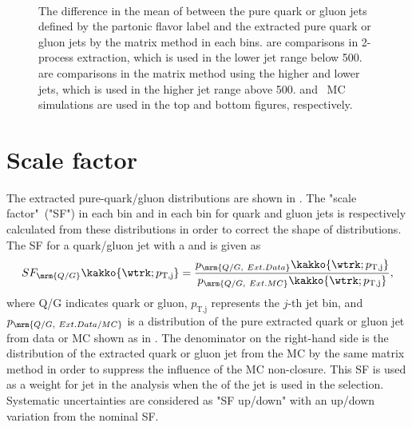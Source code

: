 \begin{figure}[htb]
  \centering
   \quad
  \\ \quad
  \caption[]{
    The difference in the mean of \cbeta between the pure quark or gluon jets defined by the partonic flavor label %
    and the extracted pure quark or gluon jets by the matrix method in each \pt bins. %
     are comparisons in 2-process extraction, 
    which is used in the lower jet \pt range below 500\GeV.
     are comparisons in the matrix method %
    using the higher and lower \abseta jets, 
    which is used in the higher jet \pt range above 500\GeV.
     and \sherpa~MC simulations are used in the top and bottom figures, respectively.
    \label{fig:QG-C1B02Closure}
    }
\end{figure}


\FloatBarrier

\section{Scale factor}
\label{sec:QG-SF}

The extracted pure-quark/gluon distributions are shown in . %
The "scale factor"~("SF") in each \wtrk bin and in each \pt bin for quark and gluon jets is respectively calculated from these distributions %
in order to correct the shape of \wtrk distributions. %
The SF for a quark/gluon jet with a \pt and \wtrk is given as %
\begin{equation}
  SF_{\mrm{Q/G}}\kakko{\wtrk;p_{\text{T,j}}} = \frac{ p_{\mrm{Q/G,~Ext.Data}}\kakko{\wtrk;p_{\text{T,j}}} }{ p_{\mrm{Q/G,~Ext.MC}}\kakko{\wtrk;p_{\text{T,j}}}  }, 
  \label{eq:QG-SF}
\end{equation}
where Q/G indicates quark or gluon, $p_{\text{T,j}}$ represents the $j$-th jet \pt bin, %
and $p_{\mrm{Q/G,~Ext.Data/MC}}$ is a distribution of the pure extracted quark or gluon jet from data or MC shown as in . %
The denominator on the right-hand side is the distribution of the extracted quark or gluon jet from the MC by the same matrix method %
in order to suppress the influence of the MC non-closure. %
This SF is used as a weight for jet in the analysis when the \wtrk of the jet is used in the selection. %
Systematic uncertainties are considered as "SF up/down" with an up/down variation from the nominal SF. %

